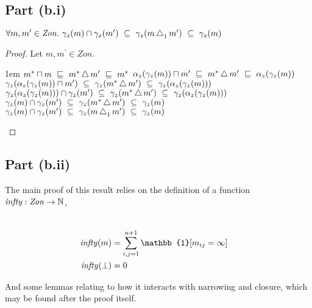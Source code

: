 \subsection{Part (b.i)}\label{sec:q-1-b-i}
\begin{prop}\label{prop:narrow-lb}
  $\forall m,m^\prime\in\mathit{Zon}.~\gamma_z(m)\cap\gamma_z(m^\prime)~\subseteq~\gamma_z(m\operatorname{\triangle}_1 m^\prime)~\subseteq~\gamma_z(m)$
  \begin{proof}
    Let $m,m^\prime\in\mathit{Zon}$.
    \begin{itemize}\itemsep1em
      \step $m^\ast\sqcap m~\sqsubseteq~m^\ast\operatorname{\triangle} m^\prime~\sqsubseteq~m^\ast$
      \step[\iffs] $\alpha_z(\gamma_z(m))\sqcap m^\prime~\sqsubseteq~m^\ast\operatorname{\triangle} m^\prime~\sqsubseteq~\alpha_z(\gamma_z(m))$
      \step[\imps] $\gamma_z(\alpha_z(\gamma_z(m))\sqcap m^\prime)~\subseteq~\gamma_z(m^\ast\operatorname{\triangle} m^\prime)~\subseteq~\gamma_z(\alpha_z(\gamma_z(m)))$
      \step[\imps] $\gamma_z(\alpha_z(\gamma_z(m)))\cap\gamma_z(m^\prime)~\subseteq~\gamma_z(m^\ast\operatorname{\triangle} m^\prime)~\subseteq~\gamma_z(\alpha_z(\gamma_z(m)))$
      \step[\iffs] $\gamma_z(m)\cap\gamma_z(m^\prime)~\subseteq~\gamma_z(m^\ast\operatorname{\triangle} m^\prime)~\subseteq~\gamma_z(m)$
      \step[\iffs] $\gamma_z(m)\cap\gamma_z(m^\prime)~\subseteq~\gamma_z(m\operatorname{\triangle}_1m^\prime)~\subseteq~\gamma_z(m)$
    \end{itemize}
  \end{proof}
\end{prop}

\subsection{Part (b.ii)}\label{sec:q-1-b-ii}

The main proof of this result relies on the definition of a function $\operatorname{\mathit{infty}} : \mathit{Zon}\to\mathbb{N}$,

\begin{align*}
  \\ \Infty(m) & = \sum_{i,j = 1}^{n+1}\mathbb{1}[m_{ij} = \infty]
  \\ \Infty(\bot) & = 0
\end{align*}

And some lemmas relating to how it interacts with narrowing and closure, which may be found after the proof itself.

